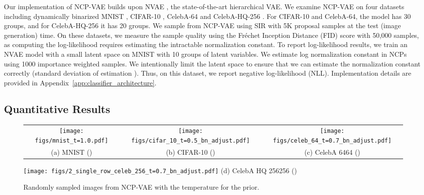 \documentclass{article} \usepackage{iclr2021_conference,times}
\begin{document}
Our implementation of NCP-VAE builds upon NVAE 
\citep{vahdat2020NVAE}, the state-of-the-art hierarchical VAE. We examine NCP-VAE on four datasets including dynamically binarized MNIST \citep{lecun1998mnist}, CIFAR-10 \citep{krizhevsky2009learning}, CelebA-64 \citep{liu2015deep} and CelebA-HQ-256 \citep{karras2017progressive}. For CIFAR-10 and CelebA-64, the model has 30 groups, and for CelebA-HQ-256 it has 20 groups. We sample from NCP-VAE using SIR with 5K proposal samples at the test (image generation) time. On these datasets, we measure the sample quality using the Fr\'echet Inception Distance (FID) score \citep{heusel2017gans} with 50,000 samples, as computing the log-likelihood requires estimating the intractable normalization constant. To report log-likelihood results, we train an NVAE model with a small latent space on MNIST with 10 groups of  latent variables. We estimate log normalization constant in NCPs using 1000 importance weighted samples. We intentionally limit the latent space to ensure that we can estimate the normalization constant correctly (standard deviation of  estimation ). Thus, on this dataset, we report negative log-likelihood (NLL). Implementation details are provided in Appendix~\ref{app:classifier_architecture}.


\vspace{-0.2cm}
\subsection{Quantitative Results}
\label{subsec:quan_res}

\begin{figure*}
	\centering
	 \setlength\tabcolsep{0pt}
	 \renewcommand{\arraystretch}{-2}
	\begin{tabular}{ccc}
        \texttt{[image: figs/mnist\_t=1.0.pdf]} \hspace{0.01cm} \vspace{0.1cm}&
\texttt{[image: figs/cifar\_10\_t=0.5\_bn\_adjust.pdf]}
        \hspace{0.01cm}\vspace{0.1cm}&
\texttt{[image: figs/celeb\_64\_t=0.7\_bn\_adjust.pdf]} \\
        \vspace{0.1cm}
	    {(a) MNIST ()}&	{(b) CIFAR-10 ()} & {(c) CelebA 6464 ()}
\end{tabular}
\texttt{[image: figs/2\_single\_row\_celeb\_256\_t=0.7\_bn\_adjust.pdf]}
	{(d) CelebA HQ 256256 ()}
	\caption{Randomly sampled images from NCP-VAE with the temperature  for the prior. }
	\label{fig:qualitative mnist cifar celeb 64}
	\vspace{-0.2cm}
\end{figure*}
\end{document}
